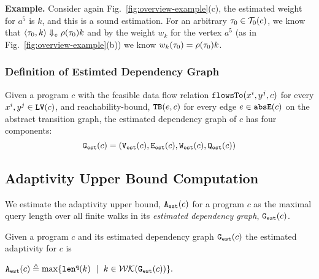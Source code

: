 \textbf{Example.} 
Consider again
Fig.~\ref{fig:overview-example}(c),
the estimated weight for $a^5$ is $k$, and this is a sound estimation.
For an arbitrary $\mathtt{\tau}_0 \in \mathcal{T}_0(c)$, we know that $\langle \mathtt{\tau}_0, k \rangle \Downarrow_e \rho(\mathtt{\tau}_0) k$ and
by the weight $w_k$ for the vertex $a^5$ (as in Fig.~\ref{fig:overview-example}(b)) we know 
$w_k(\mathtt{\tau}_0) = \rho(\mathtt{\tau}_0) k$. 
%
\subsubsection{Definition of Estimted Dependency Graph}
\begin{defn}
  \label{def:prog_graph}
  Given a program $c$ 
  with the feasible data flow relation $\mathtt{flowsTo}(x^i, y^j, c)$ for every $x^i, y^j \in \mathtt{LV}(c)$, 
  and reachability-bound, ${\mathtt{TB}}(e, c)$ for every edge $e \in \mathtt{abs}{\mathtt{E}}(c)$ on the abstract transition graph,
  the estimated dependency graph of $c$ has four components:
  \[\mathtt{{G_{est}}}(c) = (\mathtt{{V_{est}}}(c), \mathtt{{E_{est}}}(c), \mathtt{{W_{est}}}(c), \mathtt{{Q_{est}}}(c))\]
\end{defn}

\subsection{Adaptivity Upper Bound Computation}
\label{sec:alg_adaptcompute}
We estimate the adaptivity upper bound, 
${\mathtt{A_{est}}}(c)$ for a program $c$ as the maximal query length over all finite walks 
in its \emph{estimated dependency graph}, $\mathtt{{G_{est}}}({c})$.
%

\begin{defn}
\label{def:prog_adapt}
{
Given a program ${c}$ and its estimated dependency graph 
$\mathtt{{G_{est}}}({c})$
the estimated adaptivity for $c$ is 
\begin{center}
$
\progA({c})
\triangleq \max
\left\{ \qlen(k) \ \mid \  k \in \walks(\progG(c))\right \}.
$
\end{center}
}
\end{defn}



